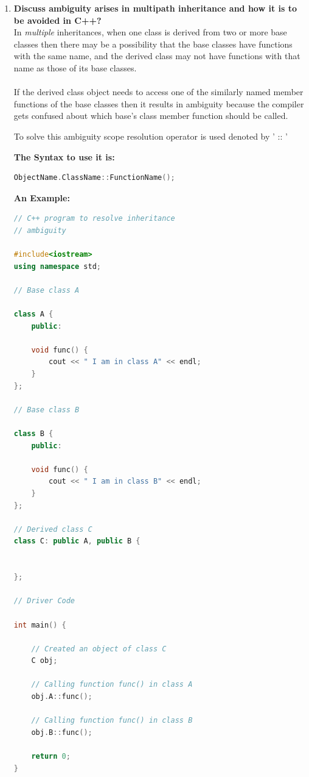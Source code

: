 \documentclass[11pt]{article}
\begin{document}
\begin{enumerate}
	\item \textbf{Discuss ambiguity arises in multipath inheritance and how it is to be avoided in C++?}\\
	      In \textit{multiple} inheritances, when one class is derived from two or more base classes then there may be a possibility that the base classes have functions with the same name, and the derived class may not have functions with that name as those of its base classes. \\
	      \\
	      If the derived class object needs to access one of the similarly named member functions of the base classes then it results in ambiguity because the compiler gets confused about which base's class member function should be called.

	      To solve this ambiguity scope resolution operator is used denoted by ' :: '

	      \textbf{The Syntax to use it is: }
	      \begin{lstlisting}[language=C++]
		ObjectName.ClassName::FunctionName();
	\end{lstlisting}

	      \textbf{An Example: }
	      \begin{lstlisting}[language=C++]
// C++ program to resolve inheritance
// ambiguity
 
#include<iostream>
using namespace std;
 
// Base class A
 
class A {
    public:
 
    void func() {
        cout << " I am in class A" << endl;
    }
};
 
// Base class B
 
class B {
    public:
 
    void func() {
        cout << " I am in class B" << endl;
    }
};
 
// Derived class C
class C: public A, public B {
 
 
};
 
// Driver Code
 
int main() {
 
    // Created an object of class C
    C obj;
 
    // Calling function func() in class A
    obj.A::func();
 
    // Calling function func() in class B
    obj.B::func();
 
    return 0;
}
		

\end{lstlisting}
\end{enumerate}
\end{document}

